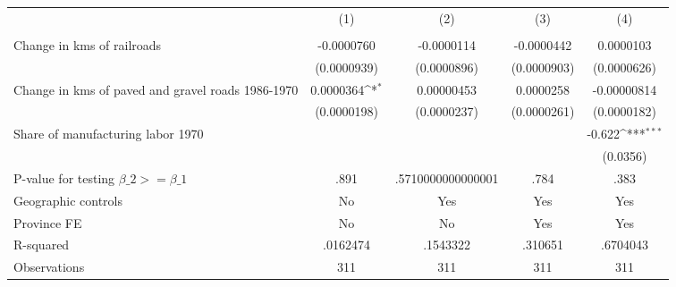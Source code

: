 {
\def\sym#1{\ifmmode^{#1}\else\(^{#1}\)\fi}
\begin{tabular}{l*{4}{c}}
\hline\hline
                &\multicolumn{1}{c}{(1)}&\multicolumn{1}{c}{(2)}&\multicolumn{1}{c}{(3)}&\multicolumn{1}{c}{(4)}\\
                &\multicolumn{1}{c}{}&\multicolumn{1}{c}{}&\multicolumn{1}{c}{}&\multicolumn{1}{c}{}\\
\hline
Change in kms of railroads&-0.0000760         &-0.0000114         &-0.0000442         &0.0000103         \\
                &(0.0000939)         &(0.0000896)         &(0.0000903)         &(0.0000626)         \\
[1em]
Change in kms of paved and gravel roads 1986-1970&0.0000364\sym{*}  &0.00000453         &0.0000258         &-0.00000814         \\
                &(0.0000198)         &(0.0000237)         &(0.0000261)         &(0.0000182)         \\
[1em]
Share of manufacturing labor 1970&                  &                  &                  &   -0.622\sym{***}\\
                &                  &                  &                  & (0.0356)         \\
\hline
P-value for testing $\beta\_{2} >= \beta\_{1}$&     .891         &.5710000000000001         &     .784         &     .383         \\
Geographic controls&       No         &      Yes         &      Yes         &      Yes         \\
Province FE     &       No         &       No         &      Yes         &      Yes         \\
R-squared       & .0162474         & .1543322         &  .310651         & .6704043         \\
Observations    &      311         &      311         &      311         &      311         \\
\hline\hline
\end{tabular}
}
